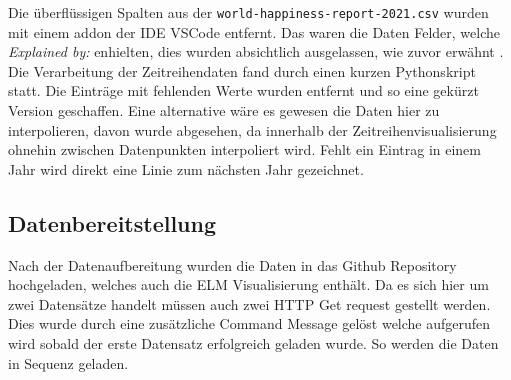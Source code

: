Die überflüssigen Spalten aus der \texttt{world-happiness-report-2021.csv} wurden mit einem addon der IDE VSCode entfernt. Das waren die Daten Felder, welche \textit{Explained by:} enhielten, dies wurden absichtlich ausgelassen, wie zuvor erwähnt . Die Verarbeitung der Zeitreihendaten fand durch einen kurzen Pythonskript statt. Die Einträge mit fehlenden Werte wurden entfernt und so eine gekürzt Version geschaffen. Eine alternative wäre es gewesen die Daten hier zu interpolieren, davon wurde abgesehen, da innerhalb der Zeitreihenvisualisierung ohnehin zwischen Datenpunkten interpoliert wird. Fehlt ein Eintrag in einem Jahr wird direkt eine Linie zum nächsten Jahr gezeichnet. 

\subsection{Datenbereitstellung}

Nach der Datenaufbereitung wurden die Daten in das Github Repository hochgeladen, welches auch die ELM Visualisierung enthält. Da es sich hier um zwei Datensätze handelt müssen auch zwei HTTP Get request gestellt werden. Dies wurde durch eine zusätzliche Command Message gelöst welche aufgerufen wird sobald der erste Datensatz erfolgreich geladen wurde. So werden die Daten in Sequenz geladen. 